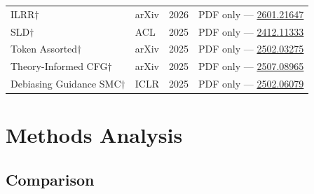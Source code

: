 \documentclass{article}
\begin{document}
\begin{longtable}{@{}p{5.5cm}llp{5cm}@{}}
ILRR$\dagger$ & arXiv & 2026 & PDF only --- \href{https://arxiv.org/abs/2601.21647}{2601.21647} \\
SLD$\dagger$ & ACL & 2025 & PDF only --- \href{https://arxiv.org/abs/2412.11333}{2412.11333} \\
Token Assorted$\dagger$ & arXiv & 2025 & PDF only --- \href{https://arxiv.org/abs/2502.03275}{2502.03275} \\
Theory-Informed CFG$\dagger$ & arXiv & 2025 & PDF only --- \href{https://arxiv.org/abs/2507.08965}{2507.08965} \\
Debiasing Guidance SMC$\dagger$ & ICLR & 2025 & PDF only --- \href{https://arxiv.org/abs/2502.06079}{2502.06079} \\
\end{longtable}

\section{Methods Analysis}

\subsection{Comparison}
\end{document}
